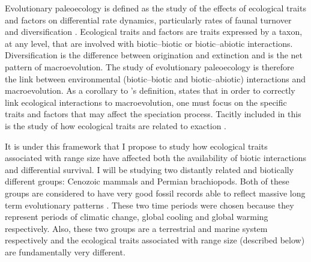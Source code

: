 \documentclass[12pt,letterpaper]{article}
\begin{document}
Evolutionary paleoecology is defined as the study of the effects of ecological traits and factors on differential rate dynamics, particularly rates of faunal turnover and diversification \citep{Kitchell1985a}. Ecological traits and factors are traits expressed by a taxon, at any level, that are involved with biotic--biotic or biotic--abiotic interactions. Diversification is the difference between origination and extinction and is the net pattern of macroevolution. The study of evolutionary paleoecology is therefore the link between environmental (biotic--biotic and biotic--abiotic) interactions and macroevolution. As a corollary to \citet{Kitchell1985a}'s definition, \citet{Allmon1994} states that in order to correctly link ecological interactions to macroevolution, one must focus on the specific traits and factors that may affect the speciation process. Tacitly included in this is the study of how ecological traits are related to exaction \citep{Kitchell1990}.


It is under this framework that I propose to study how ecological traits associated with range size have affected both the availability of biotic interactions and differential survival. I will be studying two distantly related and biotically different groups: Cenozoic mammals and Permian brachiopods. Both of these groups are considered to have very good fossil records able to reflect massive long term evolutionary patterns \citep{Mark1977}. These two time periods were chosen because they represent periods of climatic change, global cooling and global warming respectively. Also, these two groups are a terrestrial and marine system respectively and the ecological traits associated with range size (described below) are fundamentally very different. 


\end{document}
